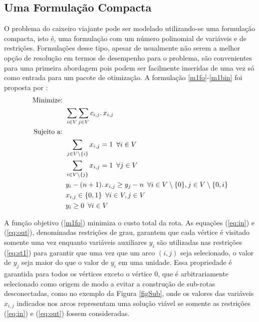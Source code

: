 \documentclass[a4paper,11pt,fleqn]{article}
\begin{document}
\subsection{Uma Formulação Compacta}

O problema do caixeiro viajante pode ser modelado utilizando-se uma formulação compacta, isto é, uma formulação com um número polinomial de variáveis e de restrições. 
Formulações desse tipo, apesar de usualmente não serem a melhor opção de resolução em termos de desempenho para o problema, são convenientes para uma primeira abordagem pois podem ser facilmente inseridas de uma vez só como entrada para um pacote de otimização. 
A formulação \eqref{m1fo}-\eqref{m1bin} foi proposta por \cite{Miller1960}:
\allowdisplaybreaks
\begin{align}
    \label{m1fo} \textrm{Minimize: }   & \nonumber \\
    &  \sum_{i \in V} \sum_{j \in V} c_{i,j} \ldotp x_{i,j} \\
    \textrm{Sujeito a: }   & \nonumber \\
    & \sum_{j \in V \setminus \{i\}} x_{i,j} = 1 \,\,\, \forall i \in V \label{eq:in}  \\
    & \sum_{i \in V \setminus \{j\}} x_{i,j} = 1 \,\,\, \forall j \in V \label{eq:out} \\
    & y_{i} -(n+1)\ldotp x_{i,j} \geq y_{j} -n  \,\,\, \forall i \in V\setminus \{0\}, j \in V\setminus \{0,i\} \label{eq:st1} \\
    & x_{i,j} \in \{0,1\} \,\,\, \forall i \in V, j \in V \\
    \label{m1bin} & y_i \geq 0 \,\,\, \forall i \in V 
\end{align}

A função objetivo (\ref{m1fo}) minimiza o custo total da rota. As equações (\ref{eq:in}) e (\ref{eq:out}), denominadas restrições de grau, garantem que cada vértice é visitado somente uma vez enquanto variáveis auxiliares $y_{i}$ são utilizadas nas restrições (\ref{eq:st1}) para garantir que uma vez que um arco $(i,j)$ seja selecionado, o valor de $y_{j}$ seja maior do que o valor de $y_{i}$ em uma unidade. 
Essa propriedade é garantida para todos os vértices exceto o vértice 0, que é arbitrariamente selecionado como origem de modo a evitar a construção de sub-rotas desconectadas, como no exemplo da Figura \ref{figSub}, onde os valores das variáveis $x_{i,j}$ indicados nos arcos representam uma solução viável se somente as restrições (\ref{eq:in}) e (\ref{eq:out}) fossem consideradas.
\end{document}
